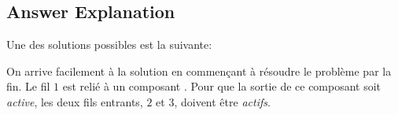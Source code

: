 \documentclass[a4paper,11pt]{report}
\newcommand{\taskGraphicsFolder}{..}
\begin{document}
\endgroup

\subsection*{Answer Explanation}

Une des solutions possibles est la suivante:

{\centering%
\par}

On arrive facilement à la solution en commençant à résoudre le problème par la fin. Le fil $1$ est relié à un composant \raisebox{\dimexpr -0.5ex -0.6ex \relax}{}. Pour que la sortie de ce composant soit \emph{active}, les deux fils entrants, $2$ et $3$, doivent être \emph{actifs}.
\end{document}
